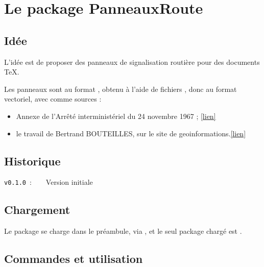 \documentclass[french,11pt,a4paper]{article}
\begin{document}
\section{Le package PanneauxRoute}

\subsection{Idée}

L'idée est de proposer des panneaux de signalisation routière pour des documents \TeX.

\smallskip

Les panneaux sont au format , obtenu à l'aide de fichiers , donc au format vectoriel, avec comme sources :

\medskip

\begin{itemize}
	\item \og Annexe de l’Arrêté interministériel du 24 novembre 1967 \fg{} ;  \hfill\href{https://equipementsdelaroute.cerema.fr/version-consolidee-de-l-arrete-du-24-novembre-1967-a537.html}{[lien]}
	\item le travail de Bertrand BOUTEILLES, sur le site de geoinformations.\hfill\href{https://www.geoinformations.developpement-durable.gouv.fr/panneaux-routiers-au-format-svg-et-png-par-a2688.html}{[lien]}
\end{itemize}

\subsection{Historique}

\verb|v0.1.0|~:~~~~Version initiale

\subsection{Chargement}

Le package se charge dans le préambule, via , et le seul package chargé est .

\begin{codehigh}[language=latex/latex3,style/main=cyan!5,style/code=cyan!5]
\usepackage{PanneauxRoute}
\end{codehigh}

\subsection{Commandes et utilisation}
\end{document}

